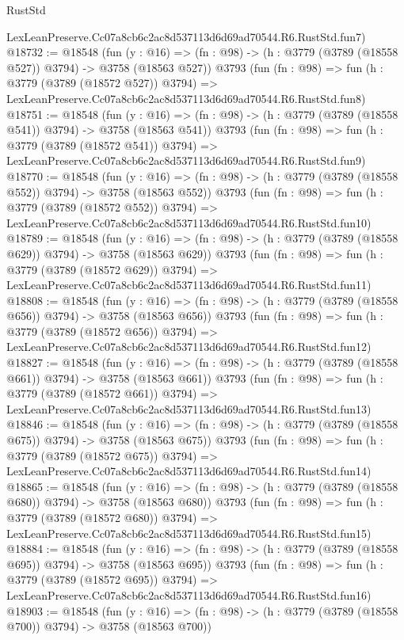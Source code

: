 \begin{lexlean}{RustStd}
\begin{coremodule}
    LexLeanPreserve.Cc07a8cb6c2ac8d537113d6d69ad70544.R6.RustStd.fun7)
@18732 := @18548
    (fun (y : @16) => (fn : @98) -> (h : @3779 (@3789 (@18558 @527)) @3794) -> @3758 (@18563 @527))
    @3793
    (fun (fn : @98) =>
    fun (h : @3779 (@3789 (@18572 @527)) @3794) =>
    LexLeanPreserve.Cc07a8cb6c2ac8d537113d6d69ad70544.R6.RustStd.fun8)
@18751 := @18548
    (fun (y : @16) => (fn : @98) -> (h : @3779 (@3789 (@18558 @541)) @3794) -> @3758 (@18563 @541))
    @3793
    (fun (fn : @98) =>
    fun (h : @3779 (@3789 (@18572 @541)) @3794) =>
    LexLeanPreserve.Cc07a8cb6c2ac8d537113d6d69ad70544.R6.RustStd.fun9)
@18770 := @18548
    (fun (y : @16) => (fn : @98) -> (h : @3779 (@3789 (@18558 @552)) @3794) -> @3758 (@18563 @552))
    @3793
    (fun (fn : @98) =>
    fun (h : @3779 (@3789 (@18572 @552)) @3794) =>
    LexLeanPreserve.Cc07a8cb6c2ac8d537113d6d69ad70544.R6.RustStd.fun10)
@18789 := @18548
    (fun (y : @16) => (fn : @98) -> (h : @3779 (@3789 (@18558 @629)) @3794) -> @3758 (@18563 @629))
    @3793
    (fun (fn : @98) =>
    fun (h : @3779 (@3789 (@18572 @629)) @3794) =>
    LexLeanPreserve.Cc07a8cb6c2ac8d537113d6d69ad70544.R6.RustStd.fun11)
@18808 := @18548
    (fun (y : @16) => (fn : @98) -> (h : @3779 (@3789 (@18558 @656)) @3794) -> @3758 (@18563 @656))
    @3793
    (fun (fn : @98) =>
    fun (h : @3779 (@3789 (@18572 @656)) @3794) =>
    LexLeanPreserve.Cc07a8cb6c2ac8d537113d6d69ad70544.R6.RustStd.fun12)
@18827 := @18548
    (fun (y : @16) => (fn : @98) -> (h : @3779 (@3789 (@18558 @661)) @3794) -> @3758 (@18563 @661))
    @3793
    (fun (fn : @98) =>
    fun (h : @3779 (@3789 (@18572 @661)) @3794) =>
    LexLeanPreserve.Cc07a8cb6c2ac8d537113d6d69ad70544.R6.RustStd.fun13)
@18846 := @18548
    (fun (y : @16) => (fn : @98) -> (h : @3779 (@3789 (@18558 @675)) @3794) -> @3758 (@18563 @675))
    @3793
    (fun (fn : @98) =>
    fun (h : @3779 (@3789 (@18572 @675)) @3794) =>
    LexLeanPreserve.Cc07a8cb6c2ac8d537113d6d69ad70544.R6.RustStd.fun14)
@18865 := @18548
    (fun (y : @16) => (fn : @98) -> (h : @3779 (@3789 (@18558 @680)) @3794) -> @3758 (@18563 @680))
    @3793
    (fun (fn : @98) =>
    fun (h : @3779 (@3789 (@18572 @680)) @3794) =>
    LexLeanPreserve.Cc07a8cb6c2ac8d537113d6d69ad70544.R6.RustStd.fun15)
@18884 := @18548
    (fun (y : @16) => (fn : @98) -> (h : @3779 (@3789 (@18558 @695)) @3794) -> @3758 (@18563 @695))
    @3793
    (fun (fn : @98) =>
    fun (h : @3779 (@3789 (@18572 @695)) @3794) =>
    LexLeanPreserve.Cc07a8cb6c2ac8d537113d6d69ad70544.R6.RustStd.fun16)
@18903 := @18548
    (fun (y : @16) => (fn : @98) -> (h : @3779 (@3789 (@18558 @700)) @3794) -> @3758 (@18563 @700))

\end{coremodule}
\end{lexlean}
